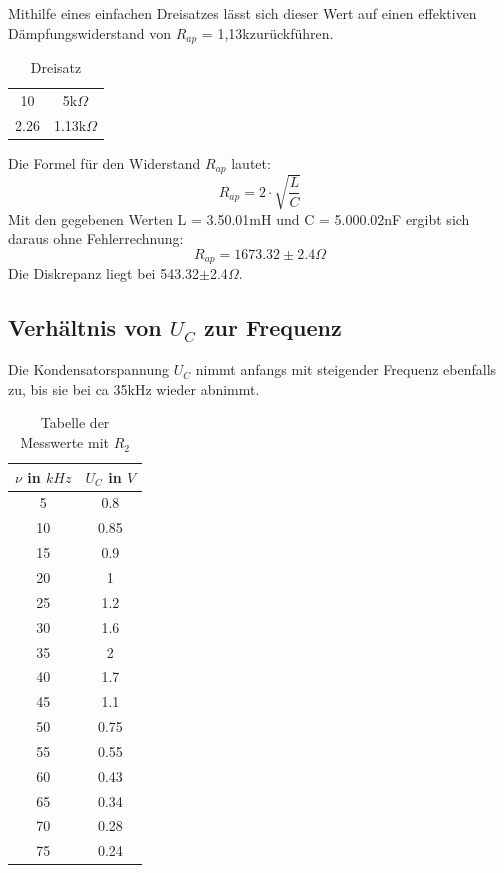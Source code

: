 Mithilfe eines einfachen Dreisatzes lässt sich dieser Wert auf einen effektiven Dämpfungswiderstand von \(R_{ap}\) = 1,13k\Omega zurückführen.

\begin{table}
  \centering
  \caption{Dreisatz}
  \label{tab:drei}
  \begin{tabular}{c c}
    \midrule
    10 & 5k\(\Omega\)\\
    2.26 & 1.13k\(\Omega\)\\
    \bottomrule
  \end{tabular}
\end{table}
Die Formel für den Widerstand \(R_{ap}\) lautet:
\begin{equation}
  R_{ap} = 2\cdot\sqrt{\frac{L}{C}}
\end{equation}
Mit den gegebenen Werten L = 3.5\pm0.01mH und C = 5.00\pm0.02nF ergibt sich daraus ohne Fehlerrechnung:
\begin{equation}
  R_{ap} = 1673.32\pm2.4\Omega
\end{equation}
Die Diskrepanz liegt bei 543.32\(\pm\)2.4\(\Omega\).

\newpage
\subsection{Verhältnis von \(U_C\) zur Frequenz}
Die Kondensatorspannung \(U_C\) nimmt anfangs mit steigender Frequenz ebenfalls zu, bis sie bei ca 35kHz wieder abnimmt.
\begin{table}
  \centering
  \caption{Tabelle der Messwerte mit \(R_2\)}
  \label{tab:tab2}
  \begin{tabular}{c c}
    \toprule
    $\nu$ in $kHz$ & \(U_C\) in $V$\\
    \midrule
    5 & 0.8\\
    10 & 0.85\\
    15 & 0.9\\
    20 & 1\\
    25 & 1.2\\
    30 & 1.6\\
    35 & 2\\
    40 & 1.7\\
    45 & 1.1\\
    50 & 0.75\\
    55 & 0.55\\
    60 & 0.43\\
    65 & 0.34\\
    70 & 0.28\\
    75 & 0.24\\
    \bottomrule
  \end{tabular}
\end{table}

